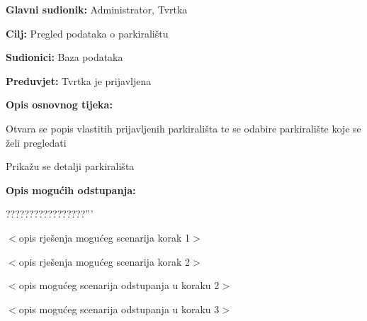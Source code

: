 \noindent {}
\begin{packed_item}
	
	\item \textbf{Glavni sudionik: } Administrator, Tvrtka
	\item  \textbf{Cilj:} Pregled podataka o parkiralištu
	\item  \textbf{Sudionici:} Baza podataka
	\item  \textbf{Preduvjet:} Tvrtka je prijavljena
	\item  \textbf{Opis osnovnog tijeka:}
	
	\item[] \begin{packed_enum}
		
		\item Otvara se popis vlastitih prijavljenih parkirališta te se odabire parkiralište koje se želi pregledati
		\item Prikažu se detalji parkirališta
	
	\end{packed_enum}
	
	\item  \textbf{Opis mogućih odstupanja:}
	
	\item[] \begin{packed_item}
		
		\item[2.a] ?????????????????'''
		\item[] \begin{packed_enum}
			
			\item $<$opis rješenja mogućeg scenarija korak 1$>$
			\item $<$opis rješenja mogućeg scenarija korak 2$>$
			
		\end{packed_enum}
		\item[2.b] $<$opis mogućeg scenarija odstupanja u koraku 2$>$
		\item[3.a] $<$opis mogućeg scenarija odstupanja  u koraku 3$>$
		
	\end{packed_item}
\end{packed_item}

